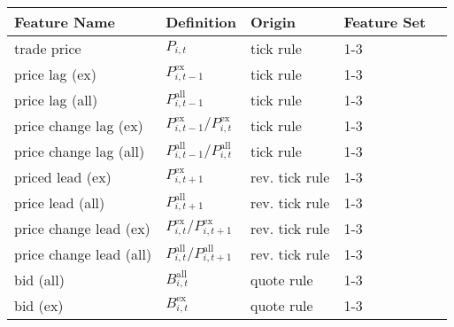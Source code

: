\begin{threeparttable}
    \begin{tabular}{@{}lllll@{}}
        \toprule
        Feature Name            & Definition                                                                                       & Origin               & Feature Set \\ \midrule
        trade price             & $P_{i, t}$                                                                                       & tick rule            & 1-3         \\
        price lag (ex)          & $P_{i, t-1}^{\text{ex}}$\tnote{*}                                                                & tick rule            & 1-3         \\
        price lag (all)         & $P_{i, t-1}^{\text{all}}$\tnote{*}                                                               & tick rule            & 1-3         \\
        price change lag (ex)   & $P_{i, t-1}^{\text{ex}}/P_{i, t}^{\text{ex}}$\tnote{*}                                           & tick rule            & 1-3         \\
        price change lag (all)  & $P_{i, t-1}^{\text{all}}/P_{i, t}^{\text{all}}$\tnote{*}                                         & tick rule            & 1-3         \\
        priced lead (ex)        & $P_{i, t+1}^{\text{ex}}$\tnote{*}                                                                & rev. tick rule       & 1-3         \\
        price lead (all)        & $P_{i, t+1}^{\text{all}}$\tnote{*}                                                               & rev. tick rule       & 1-3         \\
        price change lead (ex)  & $P_{i, t}^{\text{ex}}/P_{i, t+1}^{\text{ex}}$\tnote{*}                                           & rev. tick rule       & 1-3         \\
        price change lead (all) & $P_{i, t}^{\text{all}}/P_{i, t+1}^{\text{all}}$\tnote{*}                                         & rev. tick rule       & 1-3         \\
        bid (all)               & $B_{i, t}^{\text{all}}$                                                                          & quote rule           & 1-3         \\
        bid (ex)                & $B_{i, t}^{\text{ex}}$                                                                           & quote rule           & 1-3         \\

\end{tabular}
\end{threeparttable}
